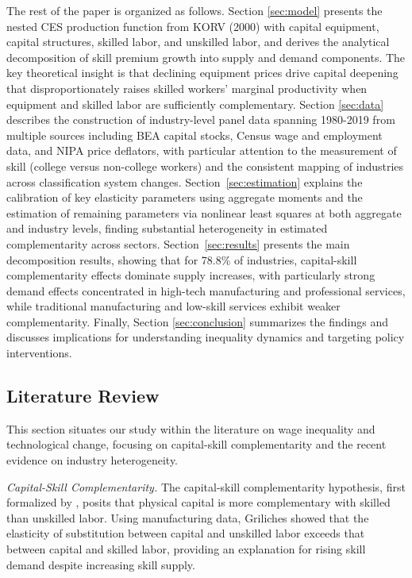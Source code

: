 \documentclass[12pt]{article}
\begin{document}
The rest of the paper is organized as follows. Section \ref{sec:model} presents the nested CES production function from KORV (2000) with capital equipment, capital structures, skilled labor, and unskilled labor, and derives the analytical decomposition of skill premium growth into supply and demand components. The key theoretical insight is that declining equipment prices drive capital deepening that disproportionately raises skilled workers' marginal productivity when equipment and skilled labor are sufficiently complementary. Section \ref{sec:data} describes the construction of industry-level panel data spanning 1980-2019 from multiple sources including BEA capital stocks, Census wage and employment data, and NIPA price deflators, with particular attention to the measurement of skill (college versus non-college workers) and the consistent mapping of industries across classification system changes. Section~\ref{sec:estimation} explains the calibration of key elasticity parameters using aggregate moments and the estimation of remaining parameters via nonlinear least squares at both aggregate and industry levels, finding substantial heterogeneity in estimated complementarity across sectors. Section~\ref{sec:results} presents the main decomposition results, showing that for 78.8\% of industries, capital-skill complementarity effects dominate supply increases, with particularly strong demand effects concentrated in high-tech manufacturing and professional services, while traditional manufacturing and low-skill services exhibit weaker complementarity. Finally, Section \ref{sec:conclusion} summarizes the findings and discusses implications for understanding inequality dynamics and targeting policy interventions.

\subsection{Literature Review}\label{sec:literature}

This section situates our study within the literature on wage inequality and technological change, focusing on capital-skill complementarity and the recent evidence on industry heterogeneity.

\textit{Capital-Skill Complementarity.}
The capital-skill complementarity hypothesis, first formalized by \citet{griliches1969capital}, posits that physical capital is more complementary with skilled than unskilled labor. Using manufacturing data, Griliches showed that the elasticity of substitution between capital and unskilled labor exceeds that between capital and skilled labor, providing an explanation for rising skill demand despite increasing skill supply.
\end{document}
